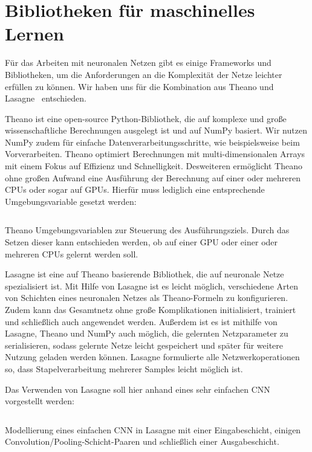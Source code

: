 \section{Bibliotheken für maschinelles Lernen}

Für das Arbeiten mit neuronalen Netzen gibt es einige Frameworks und Bibliotheken, um die Anforderungen an die Komplexität der Netze leichter erfüllen zu können.
Wir haben uns für die Kombination aus Theano \citep{theano} und Lasagne~\cite{web:lasagne} entschieden.

Theano ist eine open-source Python-Bibliothek, die auf komplexe und große wissenschaftliche Berechnungen ausgelegt ist und auf NumPy \citep{numpy} basiert. Wir nutzen NumPy zudem für einfache Datenverarbeitungsschritte, wie beispielsweise beim Vorverarbeiten. Theano optimiert Berechnungen mit multi-dimensionalen Arrays mit einem Fokus auf Effizienz und Schnelligkeit. Desweiteren ermöglicht Theano ohne großen Aufwand eine Ausführung der Berechnung auf einer oder mehreren CPUs oder sogar auf GPUs. Hierfür muss lediglich eine entsprechende Umgebungsvariable gesetzt werden:

\begin{listing}[h]
    \inputminted{bash}{../common/code/theano-flags.sh}
    \caption[Umgebungsvariable in Theano um Ausführungsziel zu bestimmen]{Theano Umgebungsvariablen zur Steuerung des Ausführungsziels. Durch das Setzen dieser kann entschieden werden, ob auf einer GPU oder einer oder mehreren CPUs gelernt werden soll.}
\end{listing}

Lasagne ist eine auf Theano basierende Bibliothek, die auf neuronale Netze spezialisiert ist. Mit Hilfe von Lasagne ist es leicht möglich, verschiedene Arten von Schichten eines neuronalen Netzes als Theano-Formeln zu konfigurieren. Zudem kann das Gesamtnetz ohne große Komplikationen initialisiert, trainiert und schließlich auch angewendet werden.
Außerdem ist es ist mithilfe von Lasagne, Theano und NumPy auch möglich, die gelernten Netzparameter zu serialisieren, sodass gelernte Netze leicht gespeichert und später für weitere Nutzung geladen werden können. Lasagne formulierte alle Netzwerkoperationen so, dass Stapelverarbeitung mehrerer Samples leicht möglich ist.

Das Verwenden von Lasagne soll hier anhand eines sehr einfachen CNN vorgestellt werden:

\begin{listing}[h]
    \inputminted{python}{../common/code/lasagne.py}
    \caption[CNN in Lasagne]{Modellierung eines einfachen CNN in Lasagne mit einer Eingabeschicht, einigen Convolution/Pooling-Schicht-Paaren und schließlich einer Ausgabeschicht.}
\end{listing}

